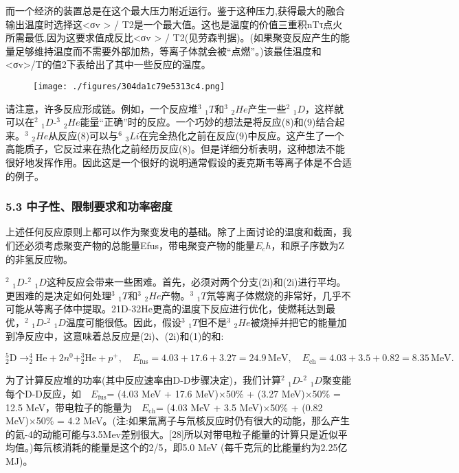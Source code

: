 而一个经济的装置总是在这个最大压力附近运行。鉴于这种压力,获得最大的融合输出温度时选择这<σv > / T2是一个最大值。这也是温度的价值三重积nTτ点火所需最低,因为这要求值成反比<σv > / T2(见劳森判据)。(如果聚变反应产生的能量足够维持温度而不需要外部加热，等离子体就会被“点燃”。)该最佳温度和<σv>/T的值2下表给出了其中一些反应的温度。
\begin{figure}[ht]
\centering
\texttt{[image: ./figures/304da1c79e5313c4.png]}
\caption\label{fig_HJB_8}
\end{figure}
请注意，许多反应形成链。例如，一个反应堆$^{3}$ $_{1}T$和$^{3}$ $_{2}He$产生一些$^{2}$ $_{1}D$，这样就可以在$^{2}$ $_{1}D$-$^{3}$ $_{2}He$能量“正确”时的反应。一个巧妙的想法是将反应(8)和(9)结合起来。$^{3}$ $_{2}He$从反应(8)可以与$^{6}$ $_{3}Li$在完全热化之前在反应(9)中反应。这产生了一个高能质子，它反过来在热化之前经历反应(8)。但是详细分析表明，这种想法不能很好地发挥作用。因此这是一个很好的说明通常假设的麦克斯韦等离子体是不合适的例子。
\subsubsection{5.3 中子性、限制要求和功率密度}
上述任何反应原则上都可以作为聚变发电的基础。除了上面讨论的温度和截面，我们还必须考虑聚变产物的总能量Efus，带电聚变产物的能量$E_ch$，和原子序数为Z的非氢反应物。

$^{2}$ $_{1}D$-$^{2}$ $_{1}D$这种反应会带来一些困难。首先，必须对两个分支(2i)和(2i)进行平均。更困难的是决定如何处理$^{3}$ $_{1}T$和$^{3}$ $_{2}He$产物。$^{3}$ $_{1}T$氘等离子体燃烧的非常好，几乎不可能从等离子体中提取。21D-32He更高的温度下反应进行优化，使燃耗达到最优，$^{2}$ $_{1}D$-$^{2}$ $_{1}D$温度可能很低。因此，假设$^{3}$ $_{1}T$但不是$^{3}$ $_{2}He$被烧掉并把它的能量加到净反应中，这意味着总反应是(2i)、(2i)和(1)的和:

$$^{5}_{2}\text{D} \rightarrow ^{4}_{2}\text{He} + 2n^{0} + ^{3}_{2}\text{He} + p^{+}, \quad E_{\text{fus}} = 4.03 + 17.6 + 3.27 = 24.9 \, \text{MeV}, \quad E_{\text{ch}} = 4.03 + 3.5 + 0.82 = 8.35 \, \text{MeV}.~$$

为了计算反应堆的功率(其中反应速率由D-D步骤决定)，我们计算$^{2}$ $_{1}D$-$^{2}$ $_{1}D$聚变能每个D-D反应，如$\quad E_{\text{fus}}$= (4.03 MeV + 17.6 MeV)×50\% + (3.27 MeV)×50\% = 12.5 MeV，带电粒子的能量为$\quad E_{\text{ch}}$= (4.03 MeV + 3.5 MeV)×50\% + (0.82 MeV)×50\% = 4.2 MeV。(注:如果氚离子与氘核反应时仍有很大的动能，那么产生的氦-4的动能可能与3.5Mev差别很大。[28]所以对带电粒子能量的计算只是近似平均值。)每氘核消耗的能量是这个的2/5，即5.0 MeV (每千克氘的比能量约为2.25亿MJ)。

